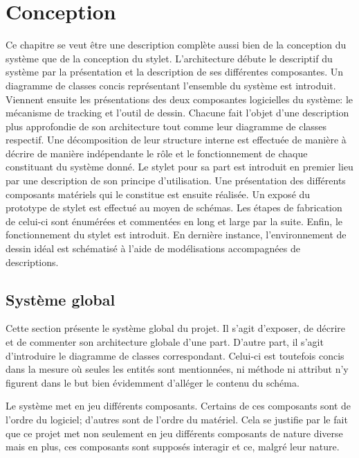\documentclass[11pt,a4paper,oldfontcommands]{memoir}
\begin{document}

\chapter{Conception}

Ce chapitre se veut être une description complète aussi bien de la conception du système que de la conception du stylet. L'architecture débute le descriptif du système par la présentation et la description de ses différentes composantes. Un diagramme de classes concis représentant l'ensemble du système est introduit. Viennent ensuite les présentations des deux composantes logicielles du système: le mécanisme de tracking et l'outil de dessin. Chacune fait l'objet d'une description plus approfondie de son architecture tout comme leur diagramme de classes respectif. Une décomposition de leur structure interne est effectuée de manière à décrire de manière indépendante le rôle et le fonctionnement de chaque constituant du système donné. Le stylet pour sa part est introduit en premier lieu par une description de son principe d'utilisation. Une présentation des différents composants matériels qui le constitue est ensuite réalisée. Un exposé du prototype de stylet est effectué au moyen de schémas. Les étapes de fabrication de celui-ci sont énumérées et commentées en long et large par la suite. Enfin, le fonctionnement du stylet est introduit. En dernière instance, l'environnement de dessin idéal est schématisé à l'aide de modélisations accompagnées de descriptions.

\section{Système global}

Cette section présente le système global du projet. Il s'agit d'exposer, de décrire et de commenter son architecture globale d'une part. D'autre part, il s'agit d'introduire le diagramme de classes correspondant. Celui-ci est toutefois concis dans la mesure où seules les entités sont mentionnées, ni méthode ni attribut n'y figurent dans le but bien évidemment d'alléger le contenu du schéma.

Le système met en jeu différents composants. Certains de ces composants sont de l'ordre du logiciel; d'autres sont de l'ordre du matériel. Cela se justifie par le fait que ce projet met non seulement en jeu différents composants de nature diverse mais en plus, ces composants sont supposés interagir et ce, malgré leur nature.
\end{document}
